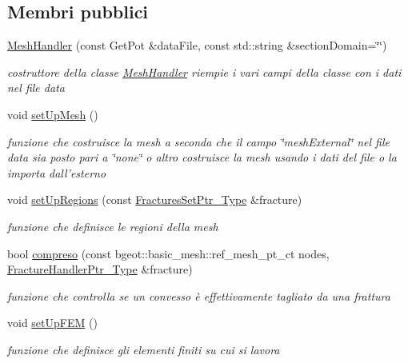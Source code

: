 \subsection*{Membri pubblici}
\begin{DoxyCompactItemize}
\item 
\hyperlink{classMeshHandler_a4a6aafe27953fe927553ef27415ead1d}{Mesh\-Handler} (const Get\-Pot \&data\-File, const std\-::string \&section\-Domain=\char`\"{}\char`\"{})
\begin{DoxyCompactList}\small\item\em costruttore della classe \hyperlink{classMeshHandler}{Mesh\-Handler} riempie i vari campi della classe con i dati nel file data \end{DoxyCompactList}\item 
void \hyperlink{classMeshHandler_a995d8cdc483a06966210193d796a3fc9}{set\-Up\-Mesh} ()
\begin{DoxyCompactList}\small\item\em funzione che costruisce la mesh a seconda che il campo \char`\"{}mesh\-External\char`\"{} nel file data sia posto pari a \char`\"{}none\char`\"{} o altro costruisce la mesh usando i dati del file o la importa dall'esterno \end{DoxyCompactList}\item 
void \hyperlink{classMeshHandler_ad25f2a8ce85bcf1d5044e7de829a722a}{set\-Up\-Regions} (const \hyperlink{FracturesSet_8h_ac29a2a91d3af77fb459980a7db47f420}{Fractures\-Set\-Ptr\-\_\-\-Type} \&fracture)
\begin{DoxyCompactList}\small\item\em funzione che definisce le regioni della mesh \end{DoxyCompactList}\item 
bool \hyperlink{classMeshHandler_a3c8a354d214222155cb4eecf8214c938}{compreso} (const bgeot\-::basic\-\_\-mesh\-::ref\-\_\-mesh\-\_\-pt\-\_\-ct nodes, \hyperlink{FractureHandler_8h_af23fb7a30aaff864bd42587af4f1e78a}{Fracture\-Handler\-Ptr\-\_\-\-Type} \&fracture)
\begin{DoxyCompactList}\small\item\em funzione che controlla se un convesso è effettivamente tagliato da una frattura \end{DoxyCompactList}\item 
void \hyperlink{classMeshHandler_af195ebf949ecf994fbaf06b83636cf0e}{set\-Up\-F\-E\-M} ()
\begin{DoxyCompactList}\small\item\em funzione che definisce gli elementi finiti su cui si lavora \end{DoxyCompactList}\item 

\end{DoxyCompactItemize}
